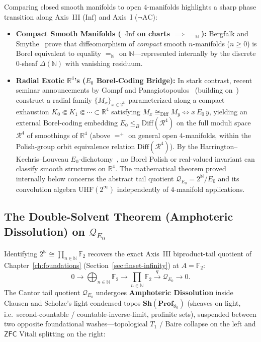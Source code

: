 \documentclass[10pt,twoside,openright]{book}
\theoremstyle{crmplain}
\theoremstyle{crmdef}
\theoremstyle{crmremark}
\begin{document}
Comparing closed smooth manifolds to open $4$-manifolds highlights a sharp phase transition along Axis~III ($\mathrm{Inf}$) and Axis~I ($\neg\mathrm{AC}$):
\begin{itemize}[leftmargin=1.5em]
  \item \textbf{Compact Smooth Manifolds ($\neg\mathrm{Inf}$ on charts $\implies \, =_{\mathbb{N}}$):} Bergfalk and Smythe~\cite[Theorem~A]{BergfalkSmythe25} prove that diffeomorphism of \emph{compact} smooth $n$-manifolds ($n \ge 0$) is Borel equivalent to equality $=_{\mathbb{N}}$ on $\mathbb{N}$---represented internally by the discrete $0$-sheaf $\Delta(\mathbb{N})$ with vanishing residuum.
  \item \textbf{Radial Exotic $\mathbb{R}^4$'s ($E_0$ Borel-Coding Bridge):} In stark contrast, recent seminar announcements by Gompf and Panagiotopoulos~\cite{GompfPanagiotopoulos26} (building on~\cite{DeMichelisFreedman92}) construct a radial family $\{M_x\}_{x \in 2^{\mathbb{N}}}$ parameterized along a compact exhaustion $K_0 \Subset K_1 \Subset \cdots \subset \mathbb{R}^4$ satisfying $M_x \cong_{\mathrm{Diff}} M_y \iff x \,E_0\, y$, yielding an external Borel-coding embedding $E_0 \le_B \mathrm{Diff}(\mathcal{R}^4)$ on the full moduli space $\mathcal{R}^4$ of smoothings of $\mathbb{R}^4$ (above $=^+$ on general open $4$-manifolds, within the Polish-group orbit equivalence relation $\mathrm{Diff}(\mathcal{R}^4)$). By the Harrington--Kechris--Louveau $E_0$-dichotomy~\cite[Theorem~1.1]{HKL90}, no Borel Polish or real-valued invariant can classify smooth structures on $\mathbb{R}^4$. The mathematical theorem proved internally below concerns the abstract tail quotient $\mathcal{Q}_{E_0} = 2^{\mathbb{N}}/E_0$ and its convolution algebra $\mathrm{UHF}(2^\infty)$ independently of $4$-manifold applications.
\end{itemize}

\subsection{\texorpdfstring{The Double-Solvent Theorem (Amphoteric Dissolution) on $\mathcal{Q}_{E_0}$}{The Double-Solvent Theorem (Amphoteric Dissolution) on QE0}}

Identifying $2^{\mathbb{N}} \cong \prod_{n \in \mathbb{N}} \mathbb{F}_2$ recovers the exact Axis~III biproduct-tail quotient of Chapter~\ref{ch:foundations} (Section~\ref{sec:finset-infinity}) at $A = \mathbb{F}_2$:
\[
  0 \longrightarrow \bigoplus_{n \in \mathbb{N}} \mathbb{F}_2 \longrightarrow \prod_{n \in \mathbb{N}} \mathbb{F}_2 \xrightarrow{\;q\;} \mathcal{Q}_{E_0} \longrightarrow 0.
\]
The Cantor tail quotient $\mathcal{Q}_{E_0}$ undergoes \textbf{Amphoteric Dissolution} inside Clausen and Scholze's light condensed topos $\mathbf{Sh}(\mathbf{Prof}_{\aleph_0})$ (sheaves on light, i.e.\ second-countable / countable-inverse-limit, profinite sets), suspended between two opposite foundational washes---topological $T_1$ / Baire collapse on the left and $\mathsf{ZFC}$ Vitali splitting on the right:
\end{document}
